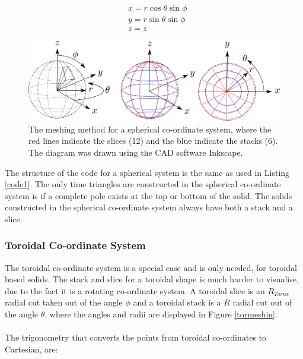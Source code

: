 \documentclass[12pt,a4paper]{article}
\begin{document}
\begin{equation}
\begin{aligned}
& x = r \cos{\theta}\sin{\phi}\\
& y = r \sin{\theta}\sin{\phi} \\
& z = z
\end{aligned}
\label{trigsph}
\end{equation}
\begin{figure}[h!]
\centering
\includegraphics[scale=0.5]{Images//Coords//sph.png}
\caption[width=\columnwidth]{The meshing method for a spherical co-ordinate system, where the red lines indicate the slices (12) and the blue indicate the stacks (6). The diagram was drawn using the CAD software Inkscape.}
\label{sphmeshin}
\end{figure}

\noindent The structure of the code for a spherical system is the same as used in Listing \ref{code1}. The only time triangles are constructed in the spherical co-ordinate system is if a complete pole exists at the top or bottom of the solid. The solids constructed in the spherical co-ordinate system always have both a stack and a slice.

%

\newpage
\subsubsection{Toroidal Co-ordinate System}

The toroidal co-ordinate system is a special case and is only needed, for toroidal based solids. The stack and slice for a toroidal shape is much harder to visualise, due to the fact it is a rotating co-ordinate system. A toroidal slice is an $R_{Torus}$ radial cut taken out of the angle $\phi$ and a toroidal stack is a $R$ radial cut out of the angle $\theta$, where the angles and radii are displayed in Figure \ref{tormeshin}. 
\\\\
The trigonometry that converts the points from toroidal co-ordinates to Cartesian, are:
\end{document}
